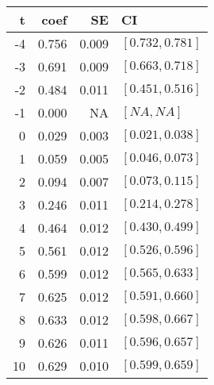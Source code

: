
\begin{tabular}[t]{rrrl}
\toprule
t & coef & SE & CI\\
\midrule
-4 & 0.756 & 0.009 & $[0.732 , 0.781]$\\
-3 & 0.691 & 0.009 & $[0.663 , 0.718]$\\
-2 & 0.484 & 0.011 & $[0.451 , 0.516]$\\
-1 & 0.000 & NA & $[NA , NA]$\\
0 & 0.029 & 0.003 & $[0.021 , 0.038]$\\
1 & 0.059 & 0.005 & $[0.046 , 0.073]$\\
2 & 0.094 & 0.007 & $[0.073 , 0.115]$\\
3 & 0.246 & 0.011 & $[0.214 , 0.278]$\\
4 & 0.464 & 0.012 & $[0.430 , 0.499]$\\
5 & 0.561 & 0.012 & $[0.526 , 0.596]$\\
6 & 0.599 & 0.012 & $[0.565 , 0.633]$\\
7 & 0.625 & 0.012 & $[0.591 , 0.660]$\\
8 & 0.633 & 0.012 & $[0.598 , 0.667]$\\
9 & 0.626 & 0.011 & $[0.596 , 0.657]$\\
10 & 0.629 & 0.010 & $[0.599 , 0.659]$\\
\bottomrule
\end{tabular}
